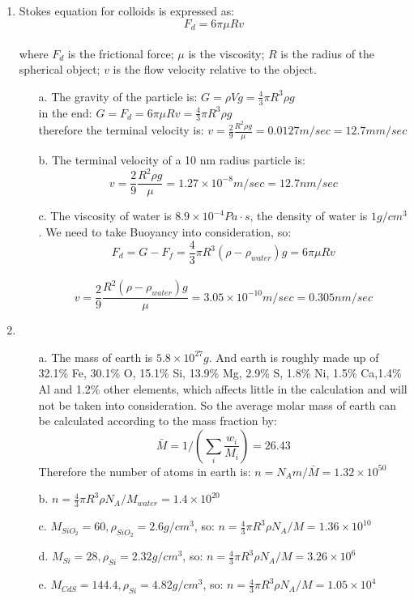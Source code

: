 \begin{enumerate}
    \item Stokes equation for colloids is expressed as: $$F_d=6 \pi \mu R v $$ \\ where  $F_d$ is the frictional force; $\mu$ is the viscosity; $R$ is the radius of the spherical object; $v$ is the flow velocity relative to the object. 
    \begin{enumerate}
        \item[a.] The gravity of the particle is: $G=\rho Vg=\frac{4}{3} \pi R^3 \rho g$\\
        in the end: $G=F_d=6 \pi \mu R v = \frac{4}{3} \pi R^3 \rho g$\\
        therefore the terminal velocity is: $v=\frac{2}{9}\frac{R^2\rho g}{\mu}=0.0127 m/sec=12.7 mm/sec$
        \item[b.] The terminal velocity of a 10 nm radius particle is: $$v=\frac{2}{9}\frac{R^2\rho g}{\mu}=1.27\times 10^{-8}m/sec=12.7 nm/sec$$
        \item[c.] The viscosity of water is $8.9\times 10^{-4}Pa\cdot s$, the density of water is $1g/cm^3$. We need to take Buoyancy into consideration, so: $$F_d=G-F_f=\frac{4}{3} \pi R^3 (\rho-\rho_{water})g=6 \pi \mu R v$$ \\ 
        $$v=\frac{2}{9}\frac{R^2(\rho-\rho_{water}) g}{\mu}=3.05\times 10^{-10}m/sec=0.305nm/sec$$ 
    \end{enumerate}
    
   \newpage
   
   \item
    \begin{enumerate}
        \item[a.] The mass of earth is $5.8\times10^{27}g$. And earth is roughly made up of 32.1\% Fe, 30.1\% O, 15.1\% Si, 13.9\% Mg, 2.9\% S, 1.8\% Ni, 1.5\% Ca,1.4\% Al and 1.2\% other elements, which affects little in the calculation and will not be taken into consideration. So the average molar mass of earth can be calculated according to the mass fraction by: $$\bar{M}=1/({\sum_{i} \frac{w_{i}}{M_{i}}})=26.43$$
        Therefore the number of atoms in earth is: $n=N_A m/\bar{M}=1.32\times 10^{50}$
        \item[b.]$n={\frac{4}{3} \pi R^3 \rho N_A}/{M_{water}}= 1.4\times 10^{20}$ 
        \item[c.]$M_{SiO_2}=60,  \rho _{SiO_2}=2.6g/cm^3$, so: $n={\frac{4}{3} \pi R^3 \rho N_A}/M=1.36\times 10^{10}$
        \item[d.]$M_{Si}=28,  \rho _{Si}=2.32g/cm^3$, so: $n={\frac{4}{3} \pi R^3 \rho N_A}/M=3.26\times 10^{6}$
        \item[e.]$M_{CdS}=144.4,  \rho _{Si}=4.82g/cm^3$, so: $n={\frac{4}{3} \pi R^3 \rho N_A}/M=1.05\times 10^{4}$
    \end{enumerate}
    

\end{enumerate}
